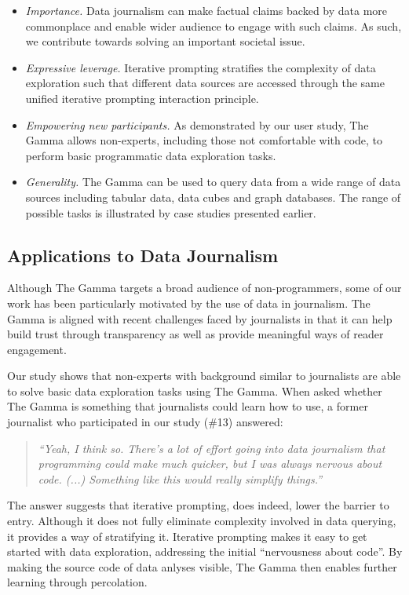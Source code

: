 \documentclass[manuscript,review,anonymous]{acmart}
\begin{document}
\begin{itemize}
\item \emph{Importance.} Data journalism can make factual claims backed by data more commonplace
and enable wider audience to engage with such claims. As such, we contribute towards
solving an important societal issue.

\item \emph{Expressive leverage.} Iterative prompting stratifies the complexity of data exploration
such that different data sources are accessed through the same unified iterative prompting
interaction principle.

\item \emph{Empowering new participants.} As demonstrated by our user study, The Gamma allows
non-experts, including those not comfortable with code, to perform basic programmatic
data exploration tasks.

\item \emph{Generality.} The Gamma can be used to query data from a wide range of data
sources including tabular data, data cubes and graph databases. The range of possible tasks is
illustrated by case studies presented earlier.
\end{itemize}

\subsection{Applications to Data Journalism}
Although The Gamma targets a broad audience of non-programmers, some of our work has been
particularly motivated by the use of data in journalism. The Gamma is aligned with recent challenges
faced by journalists in that it can help build trust through transparency as well as provide
meaningful ways of reader engagement.

Our study shows that non-experts with background similar
to journalists are able to solve basic data exploration tasks using The Gamma. When asked whether
The Gamma is something that journalists could learn how to use, a former journalist who
participated in our study (\#13) answered:

\begin{quote}
\emph{``Yeah, I think so. There's a lot of effort going into data journalism that
  programming could make much quicker, but I was always nervous about code. (...)
  Something like this would really simplify things.''}
\end{quote}

\noindent
The answer suggests that iterative prompting, does indeed, lower the barrier to entry. Although it
does not fully eliminate complexity involved in data querying, it provides a way of stratifying
it. Iterative prompting makes it easy to get started with data exploration, addressing the initial
``nervousness about code''. By making the source code of data anlyses visible, The Gamma then
enables further learning through percolation.
\end{document}
